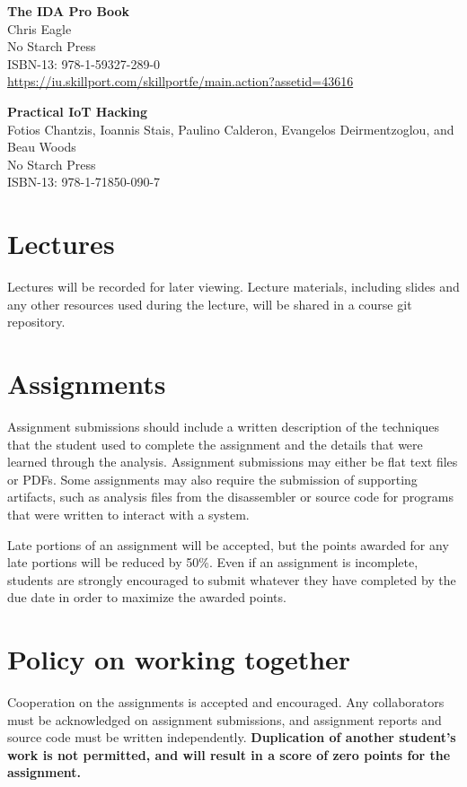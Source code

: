 \documentclass[12pt,twoside]{article}
\renewcommand\_{\textunderscore\allowbreak}
\begin{document}
{\bf The IDA Pro Book}\\
Chris Eagle\\
No Starch Press\\
ISBN-13: 978-1-59327-289-0\\
\url{https://iu.skillport.com/skillportfe/main.action?assetid=43616}

{\bf Practical IoT Hacking}\\
Fotios Chantzis, Ioannis Stais, Paulino Calderon, Evangelos Deirmentzoglou, and Beau Woods\\
No Starch Press\\
ISBN-13: 978-1-71850-090-7\\

\section{Lectures}

Lectures will be recorded for later viewing. Lecture materials, including
slides and any other resources used during the lecture, will be shared in a
course git repository.

\section{Assignments}

Assignment submissions should include a written description of the techniques
that the student used to complete the assignment and the details that were
learned through the analysis.  Assignment submissions may either be flat text
files or PDFs. Some assignments may also require the submission of supporting
artifacts, such as analysis files from the disassembler or source code for programs
that were written to interact with a system.

Late portions of an assignment will be accepted, but the points awarded for any
late portions will be reduced by 50\%. Even if an assignment is incomplete,
students are strongly encouraged to submit whatever they have completed by the
due date in order to maximize the awarded points.

\section{Policy on working together}

Cooperation on the assignments is accepted and encouraged. Any collaborators
must be acknowledged on assignment submissions, and assignment reports and
source code must be written independently. {\bf Duplication of another
student’s work is not permitted, and will result in a score of zero points for
the assignment.}
\end{document}
